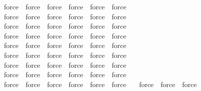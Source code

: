 \begin{isabellebody}
\ \ \isamarkupfalse \ force\ \isamarkupfalse \ force\ \isamarkupfalse \ force\ \isamarkupfalse \ force\ \isamarkupfalse \ force\ \isamarkupfalse \ force\isanewline
\ \ \isamarkupfalse \ force\ \isamarkupfalse \ force\ \isamarkupfalse \ force\ \isamarkupfalse \ force\ \isamarkupfalse \ force\ \isamarkupfalse \ force\isanewline
\ \ \isamarkupfalse \ force\ \isamarkupfalse \ force\ \isamarkupfalse \ force\ \isamarkupfalse \ force\ \isamarkupfalse \ force\ \isamarkupfalse \ force\isanewline
\ \ \isamarkupfalse \ force\ \isamarkupfalse \ force\ \isamarkupfalse \ force\ \isamarkupfalse \ force\ \isamarkupfalse \ force\ \isamarkupfalse \ force\isanewline
\ \ \isamarkupfalse \ force\ \isamarkupfalse \ force\ \isamarkupfalse \ force\ \isamarkupfalse \ force\ \isamarkupfalse \ force\ \isamarkupfalse \ force\isanewline
\ \ \isamarkupfalse \ force\ \isamarkupfalse \ force\ \isamarkupfalse \ force\ \isamarkupfalse \ force\ \isamarkupfalse \ force\ \isamarkupfalse \ force\isanewline
\ \ \isamarkupfalse \ force\ \isamarkupfalse \ force\ \isamarkupfalse \ force\ \isamarkupfalse \ force\ \isamarkupfalse \ force\ \isamarkupfalse \ force\isanewline
\ \ \isamarkupfalse \ force\ \isamarkupfalse \ force\ \isamarkupfalse \ force\ \isamarkupfalse \ force\ \isamarkupfalse \ force\ \isamarkupfalse \ force\isanewline
\ \ \isamarkupfalse \ force\ \isamarkupfalse \ force\ \isamarkupfalse \ force\ \isamarkupfalse \ force\ \isamarkupfalse \ force\ \isamarkupfalse \ force\isanewline
\ \ \isamarkupfalse \ force\ \isamarkupfalse \ force\ \isamarkupfalse \ force\ \isanewline
\ \ \isamarkupfalse \isanewline

\end{isabellebody}
